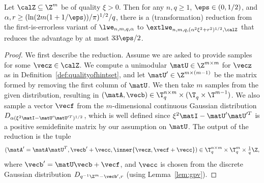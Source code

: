 \begin{lemma}\label{lem:redtoextlwe}
Let $\calZ \subseteq \Z^m$ be of quality $\xi>0$. Then for any $n,q \ge 1$, $\eps \in (0,1/2)$, and $\alpha,r  \ge (\ln(2m(1+1/\eps))/\pi)^{1/2}/q$,
there is a (transformation) reduction from the first-is-errorless variant of $\lwe_{n,m,q,\alpha}$ to
$\extlwe_{n,m,q,(\alpha^2 \xi^2 + r^2)^{1/2},\calZ}$ that reduces the advantage by at most $33 \eps/2$. 
\end{lemma}
\begin{proof}
We first describe the reduction.
Assume we are asked to provide samples for some $\vecz \in \calZ$.
We compute a unimodular $\matU \in \Z^{m \times m}$ for $\vecz$ as in Definition~\ref{def:qualityofhintset}, and let $\matU' \in \Z^{m \times (m-1)}$ be
the matrix formed by removing the first column of $\matU$.
We then take $m$ samples from the given distribution, resulting in $(\matA, \vecb) \in \T_q^{n \times m} \times (\T_q^{} \times \T^{m-1})$.
We also sample a vector $\vecf$ from the $m$-dimensional continuous Gaussian distribution
$D_{\alpha(\xi^2 \matI - \matU' \matU'^T)^{1/2}}$,
 which is well defined since $\xi^2 \matI - \matU' \matU'^T$ is a positive semidefinite matrix
by our assumption on $\matU$.
The output of the reduction is the tuple
\begin{equation}\label{eq:outputofextlwereduction}
(\matA'= \matA \matU^T,
  \vecb' + \vecc,
	\inner{\vecz , \vecf + \vecc})
	\in \T_q^{n \times m} \times \T_q^m \times {\textstyle{\frac{1}{q}}}\Z,
\end{equation}
where $\vecb'=\matU \vecb + \vecf$, and $\vecc$ is chosen from the discrete
Gaussian distribution $D_{q^{-1}\Z^m - \vecb',r}$ (using Lemma~\ref{lem:gpv}). 


\end{proof}
